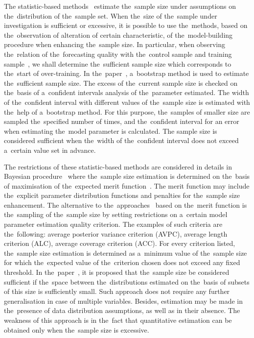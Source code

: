 \documentclass[
11pt,%
tightenlines,%
twoside,%
onecolumn,%
nofloats,%
nobibnotes,%
nofootinbib,%
superscriptaddress,%
noshowpacs,%
centertags]%
{revtex4}
\begin{document}
The statistic-based methods~\cite{motrenko2014,qumsiyeh2013}
estimate the~sample size  under assumptions on the~distribution of
the~sample set. When the~size of the~sample under investigation is
sufficient or excessive, it is possible to use the~methods, based on
the~observation of alteration of certain characteristic, of
the~model-building procedure when enhancing the~sample size. In
particular, when observing the~relation of the~forecasting quality
with the~control sample and training sample~\cite{motrenko2014}, we
shall determine the~sufficient sample size which corresponds to
the~start of over-training. In the~paper~\cite{qumsiyeh2013},
a~bootstrap method is used to estimate the~sufficient sample size.
The excess of the~current sample size is checked on the~basis of
a~confident intervals analysis of the~parameter estimated. The width
of the~confident interval with different values of the~sample size
is estimated with the~help of a~bootstrap method. For this purpose,
the~samples of smaller size are sampled the~specified number of
times, and the~confident interval for an error when estimating
the~model parameter is calculated. The sample size is considered
sufficient when the~width of the~confident interval does not exceed
a~certain value set in advance.

The restrictions of these statistic-based methods are considered in
details  in Bayesian procedure~\cite{lindley1997, rubin1998,
wang2002} where the~sample size estimation is determined on
the~basis of maximisation of the~expected merit
function~\cite{lindley1997}. The merit function may include
the~explicit parameter distribution functions and penalties for
the~sample size enhancement. The alternative to
the~approaches~\cite{wang2002} based on the~merit function is
the~sampling of the~sample size by setting restrictions on a~certain
model parameter estimation quality criterion. The examples of such
criteria are the~following: average posterior variance criterion
(AVPC), average length criterion (ALC), average coverage criterion
(ACC). For every criterion listed, the~sample size estimation is
determined as a~minimum value of the~sample size for which
the~expected value of the~criterion chosen does not exceed any fixed
threshold. In the~paper~\cite{motrenko2014}, it is proposed that
the~sample size be considered sufficient if the~space between
the~distributions estimated on the~basis of subsets of this size is
sufficiently small. Such approach does not require any further
generalisation in case of multiple variables. Besides, estimation
may be made in the~presence of data distribution assumptions, as
well as in their absence. The weakness of this approach is in
the~fact that quantitative estimation can be obtained only when
the~sample size is excessive.
\end{document}
